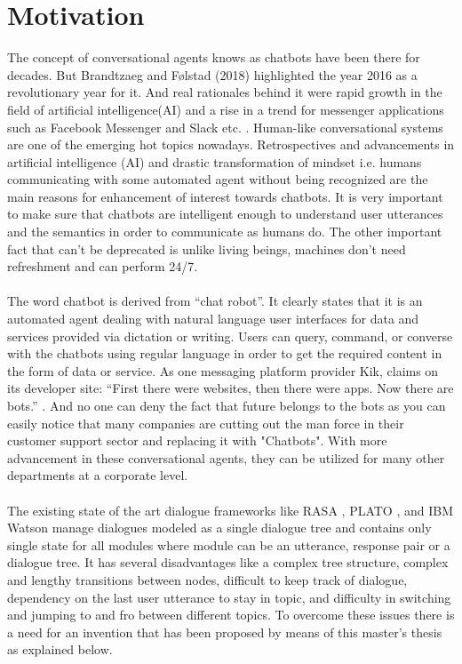 \section{Motivation}
The concept of conversational agents knows as chatbots have been there for decades. But Brandtzaeg and Følstad (2018) highlighted the year 2016 as a revolutionary year for it. And real rationales behind it were rapid growth in the field of artificial intelligence(AI) and a rise in a trend for messenger applications such as Facebook Messenger and Slack etc. \cite{ChatbotsChangingUserNeedsMotivations}. Human-like conversational systems are one of  the  emerging  hot  topics  nowadays. Retrospectives and advancements in artificial intelligence (AI) and drastic transformation of mindset i.e. humans communicating with some automated agent without being recognized are the main reasons for enhancement of interest towards chatbots. It is very important to make sure that chatbots are intelligent enough to understand user utterances and the semantics in order to communicate as humans do.  The other important fact that can’t be deprecated is unlike living beings, machines don’t need refreshment and can perform 24/7.
\\~\\
The word chatbot is derived from “chat robot”. It  clearly  states  that  it  is  an  automated agent dealing with natural language user interfaces for data and services provided via dictation or writing. Users can query, command, or converse with the chatbots using regular language in order to get the required content in the form of data or service.  As one messaging platform provider Kik, claims on its developer site:  “First there were websites, then there were apps.  Now there are bots.” \cite{ChatbotsChangingUserNeedsMotivations}. And no one can deny the fact that future belongs to the bots as you can easily notice that many companies are cutting out the man force in their customer support sector and replacing it with "Chatbots". With more advancement in these conversational agents, they can be utilized for many other departments at a corporate level.
\\~\\
The existing state of the art dialogue frameworks like RASA \cite{rasa}, PLATO \cite{plato}, and IBM Watson \cite{ibmwatson} manage dialogues modeled as a single dialogue tree and contains only single state for all modules where module can be an utterance, response pair or a dialogue tree. It has several disadvantages like a complex tree structure, complex and lengthy transitions between nodes, difficult to keep track of dialogue, dependency on the last user utterance to stay in topic, and difficulty in switching and jumping to and fro between different topics. To overcome these issues there is a need for an invention that has been proposed by means of this master's thesis as explained below.

